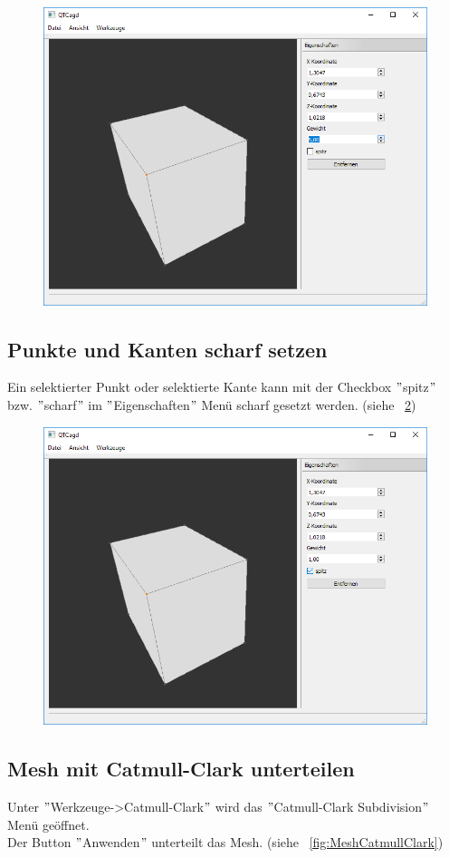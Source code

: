 \begin{figure}[ht!]
	\centering
	\includegraphics[width=0.6\linewidth]{content/pictures/6-PunkteGewichten}
	\label{fig:PunkteGewichten}
	\caption{}
\end{figure}

\subsection{Punkte und Kanten scharf setzen}
Ein selektierter Punkt oder selektierte Kante kann mit der Checkbox $"$spitz$"$ bzw. $"$scharf$"$ im $"$Eigenschaften$"$ Menü scharf gesetzt werden. (siehe ~\ref{fig:Punkte-KantenScharfSetzen})

\begin{figure}[ht!]
	\centering
	\includegraphics[width=0.6\linewidth]{content/pictures/7-Punkte-KantenScharfSetzen}
	\label{fig:Punkte-KantenScharfSetzen}
	\caption{}
\end{figure}

\subsection{Mesh mit Catmull-Clark unterteilen}
Unter $"$Werkzeuge->Catmull-Clark$"$ wird das $"$Catmull-Clark Subdivision$"$ Menü geöffnet.\\
Der Button $"$Anwenden$"$ unterteilt das Mesh. (siehe ~\ref{fig:MeshCatmullClark})

